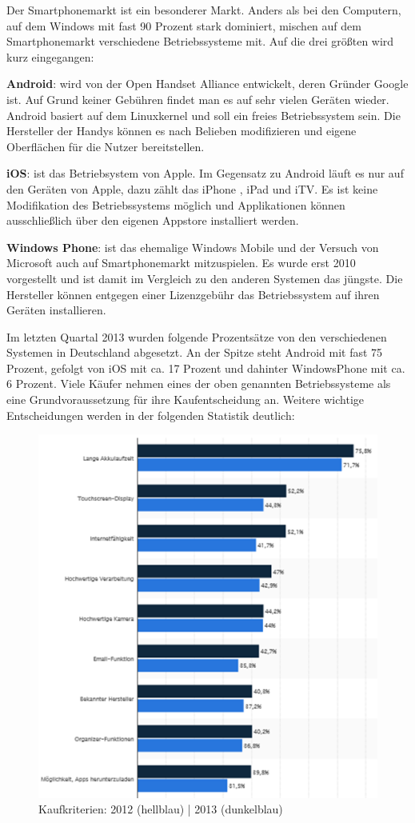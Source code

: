 Der Smartphonemarkt ist ein besonderer Markt. Anders als bei den Computern, auf dem Windows mit fast 90 Prozent 
 stark dominiert, mischen auf dem Smartphonemarkt verschiedene Betriebssysteme mit. Auf die drei größten wird kurz eingegangen:

\textbf{Android}: wird von  der Open Handset Alliance entwickelt, deren Gründer Google ist. Auf Grund keiner Gebühren findet man es  auf sehr vielen Geräten wieder. Android basiert auf dem Linuxkernel und soll ein freies Betriebssystem sein. Die Hersteller der Handys können es nach Belieben modifizieren und eigene Oberflächen für die Nutzer bereitstellen.

\textbf{iOS}: ist das Betriebsystem von Apple. Im Gegensatz zu Android läuft es nur auf den Geräten von Apple, dazu zählt das iPhone , iPad und iTV. Es ist keine Modifikation des Betriebssystems möglich und Applikationen können ausschließlich über den eigenen Appstore installiert werden.
 
\textbf{Windows Phone}: ist das ehemalige Windows Mobile und der Versuch von Microsoft auch auf Smartphonemarkt mitzuspielen. Es wurde erst 2010 vorgestellt und ist damit im Vergleich zu den anderen Systemen das jüngste. Die Hersteller können entgegen einer Lizenzgebühr das Betriebssystem auf ihren Geräten installieren.


Im letzten Quartal 2013 wurden folgende Prozentsätze von den verschiedenen Systemen in Deutschland abgesetzt. An der Spitze steht Android mit fast 75 Prozent, gefolgt von iOS mit ca. 17 Prozent und dahinter WindowsPhone mit ca. 6 Prozent.
Viele Käufer nehmen eines der oben genannten Betriebssysteme als  eine Grundvoraussetzung für ihre Kaufentscheidung an. Weitere wichtige Entscheidungen werden in der folgenden Statistik deutlich:

\begin{figure}[H]
\centering
\includegraphics[width=0.7\linewidth]{../images/statista2.png}
\caption{Kaufkriterien: 2012 (hellblau) | 2013 (dunkelblau)}
\label{fig:stat2}
\end{figure}


